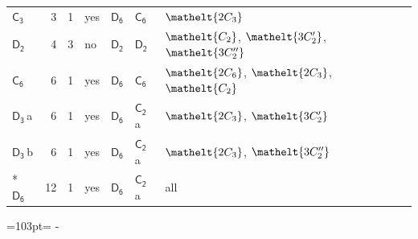 \documentclass[10pt,a4paper]{article}
\newcommand{\needspace}[1]{\par\penalty-100\begingroup\dimen0=#1\relax\dimen2=\pagegoal
  \advance\dimen2-\pagetotal\ifdim\dimen0>\dimen2\relax\ifdim\dimen2>0pt\vfil\break\fi\fi
  \endgroup}
\numberwithin{equation}{section}
\newcommand{\eltfont}[1]{{\let\sigma\eltsigma\mathelt{#1}}}
\newcommand{\grp}[1]{\mathsf{#1}}
\newcommand{\cls}[1]{\eltfont{#1}}
\newcommand{\clsletter}[1]{\,{\scriptsize\color{black!55}#1}}
\newlength{\fillwidth}\newlength{\cellwidth}\newlength{\colwidth}
\begin{document}
{\begin{longtable}{@{}lrrlll>{\RaggedRight\arraybackslash}p{\fillwidth}@{}}
\href{C3.pdf}{$\grp{C_{3}}$} & 3 & 1 & yes & \href{D6.pdf}{$\grp{D_{6}}$} & \href{C6.pdf}{$\grp{C_{6}}$} & $\cls{2C_{3}}$\\
\href{D2.pdf}{$\grp{D_{2}}$} & 4 & 3 & no & \href{D2.pdf}{$\grp{D_{2}}$} & \href{D2.pdf}{$\grp{D_{2}}$} & $\cls{C_{2}}$, $\cls{3C_{2}'}$, $\cls{3C_{2}''}$\\
\href{C6.pdf}{$\grp{C_{6}}$} & 6 & 1 & yes & \href{D6.pdf}{$\grp{D_{6}}$} & \href{C6.pdf}{$\grp{C_{6}}$} & $\cls{2C_{6}}$, $\cls{2C_{3}}$, $\cls{C_{2}}$\\
\href{D3.pdf}{$\grp{D_{3}}$}\clsletter{a} & 6 & 1 & yes & \href{D6.pdf}{$\grp{D_{6}}$} & \href{C2.pdf}{$\grp{C_{2}}$}\clsletter{a} & $\cls{2C_{3}}$, $\cls{3C_{2}'}$\\
\href{D3.pdf}{$\grp{D_{3}}$}\clsletter{b} & 6 & 1 & yes & \href{D6.pdf}{$\grp{D_{6}}$} & \href{C2.pdf}{$\grp{C_{2}}$}\clsletter{a} & $\cls{2C_{3}}$, $\cls{3C_{2}''}$\\*
\href{D6.pdf}{$\grp{D_{6}}$} & 12 & 1 & yes & \href{D6.pdf}{$\grp{D_{6}}$} & \href{C2.pdf}{$\grp{C_{2}}$}\clsletter{a} & all\\
\bottomrule\end{longtable}}
\needspace{103pt}
\end{document}
